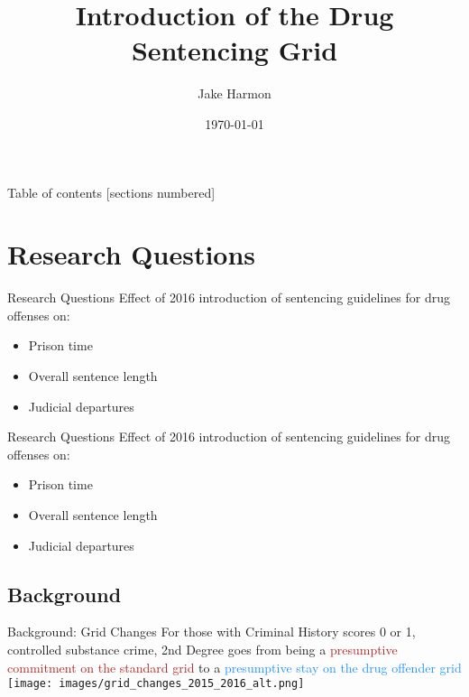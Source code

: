 \documentclass[10pt]{beamer}
\title{Introduction of the Drug Sentencing Grid}
\date{\today}
\author{Jake Harmon}
\institute{University of Minnesota -- Robina Institute}
\begin{document}
\maketitle

\begin{frame}{Table of contents}
  [sections numbered]
  \tableofcontents%
\end{frame}

\section{Research Questions}
\begin{frame}{Research Questions}
    Effect of 2016 introduction of sentencing guidelines for drug offenses on:
    \begin{itemize}
        \item Prison time
        \item Overall sentence length
        \item Judicial departures
    \end{itemize}
\end{frame}

\begin{frame}{Research Questions}
    Effect of 2016 introduction of sentencing guidelines for drug offenses on:
    \begin{itemize}
        \item \alert{Prison time}
        \item Overall sentence length
        \item Judicial departures
    \end{itemize}
\end{frame}

\subsection{Background}
\begin{frame}{Background: Grid Changes}
    For those with Criminal History scores 0 or 1, controlled substance crime, 2nd Degree goes from being a \textcolor{firebrick}{presumptive commitment on the standard grid} to a \textcolor{dodgerblue}{presumptive stay on the drug offender grid}
    \hspace*{-0.75cm}
    \vspace*{-0.75cm}
    \texttt{[image: images/grid\_changes\_2015\_2016\_alt.png]}
\end{frame}
\end{document}
